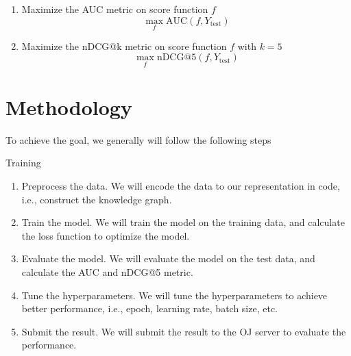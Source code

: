 \documentclass{article}
\begin{document}
\begin{enumerate}
    \item Maximize the AUC metric on score function $f$ \[\max_{f} \text{AUC}(f, Y_{\text{test}}) \]
    \item Maximize the nDCG@k metric on score function $f$ with $k = 5$ \[\max_{f} \text{nDCG@5}(f, Y_{\text{test}}) \]
\end{enumerate}

\section{Methodology}

To achieve the goal, we generally will follow the following steps

\begin{algorithm}[!ht]
\caption{Training}
\end{algorithm}

\begin{enumerate}
    \item Preprocess the data. We will encode the data to our representation in code, i.e., construct the knowledge graph.
    \item Train the model. We will train the model on the training data, and calculate the loss function to optimize the model.
    \item Evaluate the model. We will evaluate the model on the test data, and calculate the AUC and nDCG@5 metric.
    \item Tune the hyperparameters. We will tune the hyperparameters to achieve better performance, i.e., epoch, learning rate, batch size, etc.
    \item Submit the result. We will submit the result to the OJ server to evaluate the performance.
\end{enumerate}
\end{document}
